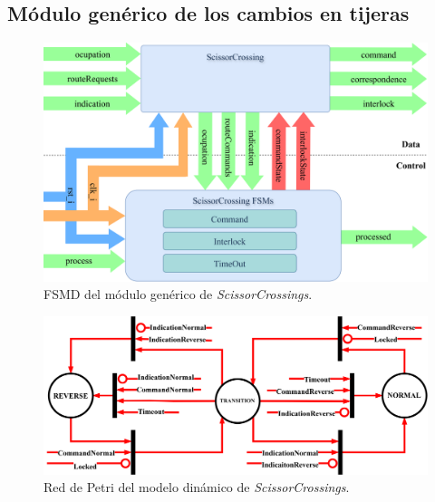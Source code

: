 \subsection{Módulo genérico de los cambios en tijeras}

\lipsum[1]

\begin{figure}[H]
	\centering
	\includegraphics[width=1\textwidth]{Figuras/SCR_module}
	\centering\caption{FSMD del módulo genérico de \textit{ScissorCrossings}.}
	\label{fig:SCR_module}
\end{figure}

\lipsum[1]

\begin{figure}[H]
	\centering
	\includegraphics[width=1\textwidth]{Figuras/SSW_Petri}
	\centering\caption{Red de Petri del modelo dinámico de \textit{ScissorCrossings}.}
	\label{fig:SCR_Petri}
\end{figure}

\lipsum[1]
